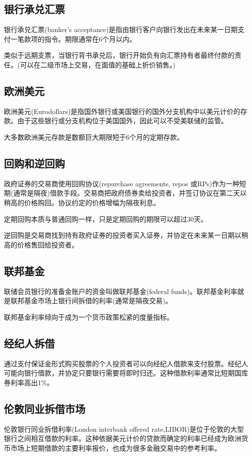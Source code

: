 \documentclass{article}
\begin{document}
\subsection{银行承兑汇票}
银行承兑汇票(banker's acceptance)是指由银行客户向银行发出在未来某一日期支付一笔款项的指令。期限通常在6个月以内。

类似于远期支票，当银行背书承兑后，银行开始负有向汇票持有者最终付款的责任。(可以在二级市场上交易，在面值的基础上折价销售。)

\subsection{欧洲美元}
欧洲美元(Eurodollars)是指国外银行或美国银行的国外分支机构中以美元计价的存款。由于这些银行或分支机构位于美国国外，因此可以不受美联储的监管。

大多数欧洲美元存款是数额巨大期限短于6个月的定期存款。

\subsection{回购和逆回购}
政府证券的交易商使用回购协议(repurchase agreements, repos 或RPs)作为一种短期(通常是隔夜)借款手段。交易商把政府债券卖给投资者，并签订协议在第二天以稍高的价格购回。协议约定的价格增幅为隔夜利息。

定期回购本质与普通回购一样，只是定期回购的期限可以超过30天。

逆回购是交易商找到持有政府证券的投资者买入证券，并协定在未来某一日期以稍高的价格售回给投资者。

\subsection{联邦基金}
联储会员银行的准备金账户的资金叫做联邦基金(federal funds)。联邦基金利率就是联邦基金市场上银行间拆借的利率(通常是隔夜交易)。

联邦基金利率倾向于成为一个货币政策松紧的度量指标。

\subsection{经纪人拆借}
通过支付保证金形式购买股票的个人投资者可以向经纪人借款来支付股票。经纪人可能向银行借款，并协定只要银行需要将即时归还。这种借款利率通常比短期国库券利率高出1\%。

\subsection{伦敦同业拆借市场}
伦敦银行同业拆借利率(London interbank offered rate,LIBOR)是位于伦敦的大型银行之间相互借款的利率。这种依据美元计价的贷款而确定的利率已经成为欧洲货币市场上短期借款的主要利率报价，也成为很多金融交易中的参考利率。
\end{document}
